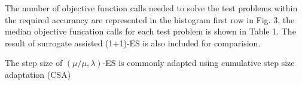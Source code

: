 The number of objective function calls needed to solve the test problems within the required accurancy are represented in the histogram first row in Fig. 3, the median objective funcation calls for each test problem is shown in Table 1. The result of surrogate assisted (1+1)-ES is also included for comparision.



The step size of $(\mu/\mu,\lambda)$-ES is commonly adapted using cumulative step size adaptation (CSA) 

















 



